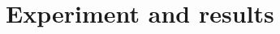 \documentclass[a4paper,num-refs]{wiley-article}
\begin{document}





\section{Experiment and results}
\label{sec:experiments}
\end{document}
